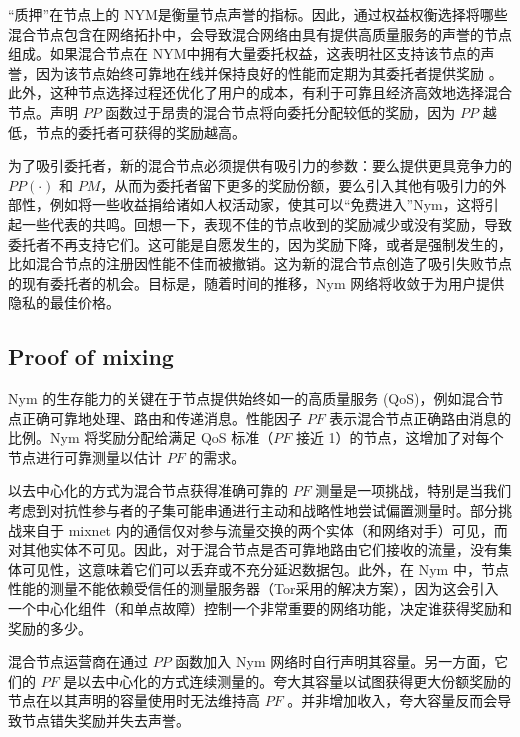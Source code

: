 \documentclass{article}
\begin{document}
	“质押”在节点上的 NYM是衡量节点声誉的指标。因此，通过权益权衡选择将哪些混合节点包含在网络拓扑中，会导致混合网络由具有提供高质量服务的声誉的节点组成。如果混合节点在 NYM中拥有大量委托权益，这表明社区支持该节点的声誉，因为该节点始终可靠地在线并保持良好的性能而定期为其委托者提供奖励 。此外，这种节点选择过程还优化了用户的成本，有利于可靠且经济高效地选择混合节点。声明 $PP$ 函数过于昂贵的混合节点将向委托分配较低的奖励，因为 $PP$ 越低，节点的委托者可获得的奖励越高。\newline

	为了吸引委托者，新的混合节点必须提供有吸引力的参数：要么提供更具竞争力的 $PP(·)$ 和 $PM$，从而为委托者留下更多的奖励份额，要么引入其他有吸引力的外部性，例如将一些收益捐给诸如人权活动家，使其可以“免费进入”Nym，这将引起一些代表的共鸣。回想一下，表现不佳的节点收到的奖励减少或没有奖励，导致委托者不再支持它们。这可能是自愿发生的，因为奖励下降，或者是强制发生的，比如混合节点的注册因性能不佳而被撤销。这为新的混合节点创造了吸引失败节点的现有委托者的机会。目标是，随着时间的推移，Nym 网络将收敛于为用户提供隐私的最佳价格。\newline

	\subsection{Proof of mixing}

	Nym 的生存能力的关键在于节点提供始终如一的高质量服务 (QoS)，例如混合节点正确可靠地处理、路由和传递消息。性能因子 $PF$ 表示混合节点正确路由消息的比例。Nym 将奖励分配给满足 QoS 标准（$PF$ 接近 1）的节点，这增加了对每个节点进行可靠测量以估计 $PF$ 的需求。\newline

	以去中心化的方式为混合节点获得准确可靠的 $PF$ 测量是一项挑战，特别是当我们考虑到对抗性参与者的子集可能串通进行主动和战略性地尝试偏置测量时。部分挑战来自于 mixnet 内的通信仅对参与流量交换的两个实体（和网络对手）可见，而对其他实体不可见。因此，对于混合节点是否可靠地路由它们接收的流量，没有集体可见性，这意味着它们可以丢弃或不充分延迟数据包。此外，在 Nym 中，节点性能的测量不能依赖受信任的测量服务器（Tor采用的解决方案），因为这会引入一个中心化组件（和单点故障）控制一个非常重要的网络功能，决定谁获得奖励和奖励的多少。\newline

	混合节点运营商在通过 $PP$ 函数加入 Nym 网络时自行声明其容量。另一方面，它们的 $PF$ 是以去中心化的方式连续测量的。夸大其容量以试图获得更大份额奖励的节点在以其声明的容量使用时无法维持高 $PF$ 。并非增加收入，夸大容量反而会导致节点错失奖励并失去声誉。\newline
\end{document}
